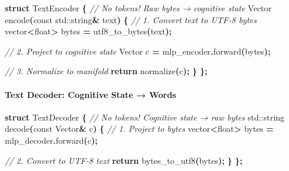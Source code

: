 \documentclass[
  11pt,
  a4paper,
]{article}
\newenvironment{Shaded}{\begin{snugshade}}{\end{snugshade}}
\newcommand{\AttributeTok}[1]{\textcolor[rgb]{0.13,0.29,0.53}{#1}}
\newcommand{\BuiltInTok}[1]{#1}
\newcommand{\CommentTok}[1]{\textcolor[rgb]{0.56,0.35,0.01}{\textit{#1}}}
\newcommand{\ControlFlowTok}[1]{\textcolor[rgb]{0.13,0.29,0.53}{\textbf{#1}}}
\newcommand{\DataTypeTok}[1]{\textcolor[rgb]{0.13,0.29,0.53}{#1}}
\newcommand{\KeywordTok}[1]{\textcolor[rgb]{0.13,0.29,0.53}{\textbf{#1}}}
\newcommand{\NormalTok}[1]{#1}
\newcommand{\OperatorTok}[1]{\textcolor[rgb]{0.81,0.36,0.00}{\textbf{#1}}}
\begin{document}
\begin{Shaded}
\begin{Highlighting}[]
\KeywordTok{struct}\NormalTok{ TextEncoder }\OperatorTok{\{}
    \CommentTok{// No tokens! Raw bytes → cognitive state}
\NormalTok{    Vector encode}\OperatorTok{(}\AttributeTok{const} \BuiltInTok{std::}\NormalTok{string}\OperatorTok{\&}\NormalTok{ text}\OperatorTok{)} \OperatorTok{\{}
        \CommentTok{// 1. Convert text to UTF{-}8 bytes}
\NormalTok{        vector}\OperatorTok{\textless{}}\DataTypeTok{float}\OperatorTok{\textgreater{}}\NormalTok{ bytes }\OperatorTok{=}\NormalTok{ utf8\_to\_bytes}\OperatorTok{(}\NormalTok{text}\OperatorTok{);}
        
        \CommentTok{// 2. Project to cognitive state}
\NormalTok{        Vector c }\OperatorTok{=}\NormalTok{ mlp\_encoder}\OperatorTok{.}\NormalTok{forward}\OperatorTok{(}\NormalTok{bytes}\OperatorTok{);}
        
        \CommentTok{// 3. Normalize to manifold}
        \ControlFlowTok{return}\NormalTok{ normalize}\OperatorTok{(}\NormalTok{c}\OperatorTok{);}
    \OperatorTok{\}}
\OperatorTok{\};}
\end{Highlighting}
\end{Shaded}

\paragraph{Text Decoder: Cognitive State →
Words}\label{text-decoder-cognitive-state-words}

\begin{Shaded}
\begin{Highlighting}[]
\KeywordTok{struct}\NormalTok{ TextDecoder }\OperatorTok{\{}
    \CommentTok{// No tokens! Cognitive state → raw bytes}
    \BuiltInTok{std::}\NormalTok{string decode}\OperatorTok{(}\AttributeTok{const}\NormalTok{ Vector}\OperatorTok{\&}\NormalTok{ c}\OperatorTok{)} \OperatorTok{\{}
        \CommentTok{// 1. Project to bytes}
\NormalTok{        vector}\OperatorTok{\textless{}}\DataTypeTok{float}\OperatorTok{\textgreater{}}\NormalTok{ bytes }\OperatorTok{=}\NormalTok{ mlp\_decoder}\OperatorTok{.}\NormalTok{forward}\OperatorTok{(}\NormalTok{c}\OperatorTok{);}
        
        \CommentTok{// 2. Convert to UTF{-}8 text}
        \ControlFlowTok{return}\NormalTok{ bytes\_to\_utf8}\OperatorTok{(}\NormalTok{bytes}\OperatorTok{);}
    \OperatorTok{\}}
\OperatorTok{\};}
\end{Highlighting}
\end{Shaded}
\end{document}
